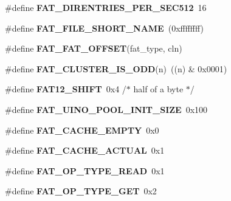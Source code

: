 \begin{DoxyCompactItemize}
\item 
\mbox{\label{group__libfs__dosfs_gaaa60c4d9b0d53c33754e9440d120d3e7}} 
\#define {\bfseries F\+A\+T\+\_\+\+D\+I\+R\+E\+N\+T\+R\+I\+E\+S\+\_\+\+P\+E\+R\+\_\+\+S\+E\+C512}~16
\item 
\mbox{\label{group__libfs__dosfs_ga8a57dc923415765b6be7183cbd069384}} 
\#define {\bfseries F\+A\+T\+\_\+\+F\+I\+L\+E\+\_\+\+S\+H\+O\+R\+T\+\_\+\+N\+A\+ME}~(0xffffffff)
\item 
\#define {\bfseries F\+A\+T\+\_\+\+F\+A\+T\+\_\+\+O\+F\+F\+S\+ET}(fat\+\_\+type,  cln)
\item 
\mbox{\label{group__libfs__dosfs_gaf6cc74f51521ad910ff8645857c56bfc}} 
\#define {\bfseries F\+A\+T\+\_\+\+C\+L\+U\+S\+T\+E\+R\+\_\+\+I\+S\+\_\+\+O\+DD}(n)~((n) \& 0x0001)
\item 
\mbox{\label{group__libfs__dosfs_ga7640d4d317a687884bfd02c9cc78071a}} 
\#define {\bfseries F\+A\+T12\+\_\+\+S\+H\+I\+FT}~0x4    /$\ast$ half of a byte $\ast$/
\item 
\mbox{\label{group__libfs__dosfs_gaa0e7780c904442f120d152ddf88096db}} 
\#define {\bfseries F\+A\+T\+\_\+\+U\+I\+N\+O\+\_\+\+P\+O\+O\+L\+\_\+\+I\+N\+I\+T\+\_\+\+S\+I\+ZE}~0x100
\item 
\mbox{\label{group__libfs__dosfs_gaef5f7ddb2d0246a03a6fef70a7a06607}} 
\#define {\bfseries F\+A\+T\+\_\+\+C\+A\+C\+H\+E\+\_\+\+E\+M\+P\+TY}~0x0
\item 
\mbox{\label{group__libfs__dosfs_ga55b107f68f8547851eb2eaa1b669b986}} 
\#define {\bfseries F\+A\+T\+\_\+\+C\+A\+C\+H\+E\+\_\+\+A\+C\+T\+U\+AL}~0x1
\item 
\mbox{\label{group__libfs__dosfs_ga64f5954ceca9821d010428fe1c73f43e}} 
\#define {\bfseries F\+A\+T\+\_\+\+O\+P\+\_\+\+T\+Y\+P\+E\+\_\+\+R\+E\+AD}~0x1
\item 
\mbox{\label{group__libfs__dosfs_ga3d278adefa76ce48842088e2755fc6b6}} 
\#define {\bfseries F\+A\+T\+\_\+\+O\+P\+\_\+\+T\+Y\+P\+E\+\_\+\+G\+ET}~0x2
\end{DoxyCompactItemize}

